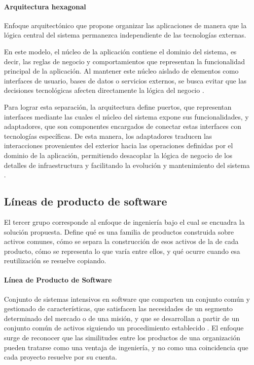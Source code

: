 \paragraph*{Arquitectura hexagonal}
Enfoque arquitectónico que propone organizar las aplicaciones de manera que la lógica central del sistema permanezca independiente de las tecnologías externas.

En este modelo, el núcleo de la aplicación contiene el dominio del sistema, es decir, las reglas de negocio y comportamientos que representan la funcionalidad principal de la aplicación. Al mantener este núcleo aislado de elementos como interfaces de usuario, bases de datos o servicios externos, se busca evitar que las decisiones tecnológicas afecten directamente la lógica del negocio \citep{AlistairCockburn2005}.

Para lograr esta separación, la arquitectura define puertos, que representan interfaces mediante las cuales el núcleo del sistema expone sus funcionalidades, y adaptadores, que son componentes encargados de conectar estas interfaces con tecnologías específicas. De esta manera, los adaptadores traducen las interacciones provenientes del exterior hacia las operaciones definidas por el dominio de la aplicación, permitiendo desacoplar la lógica de negocio de los detalles de infraestructura y facilitando la evolución y mantenimiento del sistema \citep{AlistairCockburn2005}.

\subsection{Líneas de producto de software}

El tercer grupo corresponde al enfoque de ingeniería bajo el cual se
encuadra la solución propuesta. Define qué es una familia de productos
construida sobre activos comunes, cómo se separa la construcción de esos
activos de la de cada producto, cómo se representa lo que varía entre
ellos, y qué ocurre cuando esa reutilización se resuelve copiando.
\paragraph*{Línea de Producto de Software}
Conjunto de sistemas intensivos en software que comparten un conjunto común y gestionado de características, que satisfacen las necesidades de un segmento determinado del mercado o de una misión, y que se desarrollan a partir de un conjunto común de activos siguiendo un procedimiento establecido \citep{Clements2001}. El enfoque surge de reconocer que las similitudes entre los productos de una organización pueden tratarse como una ventaja de ingeniería, y no como una coincidencia que cada proyecto resuelve por su cuenta.

